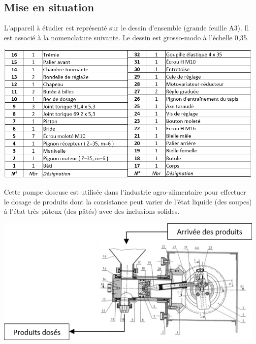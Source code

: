 \ifprof
\begin{multicols}{2}
\else
\begin{multicols}{2}
\fi



\subsection*{Mise en situation}
L’appareil à étudier est représenté sur le dessin d’ensemble (grande feuille A3). Il est associé à la nomenclature suivante. Le dessin est grosso-modo à l’échelle 0,35.

\begin{center}
\includegraphics[width=\linewidth]{images/fig_02}
\end{center}


Cette pompe doseuse est utilisée dans l’industrie agro-alimentaire pour effectuer le dosage de produits dont la consistance peut varier de l’état liquide (des soupes) à l’état très pâteux (des pâtés) avec des inclusions solides.

\begin{center}
\includegraphics[width=\linewidth]{images/fig_03}
\end{center}


\end{multicols}
\end{multicols}
